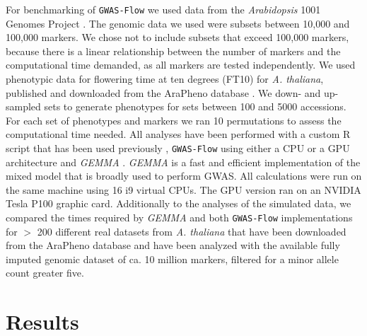 For benchmarking of \texttt{GWAS-Flow} we used data from the \textit{Arabidopsis} 1001 Genomes Project
\cite{1001genome}. The genomic data we used were subsets between 10,000 and 100,000 markers. We chose not to
include subsets that exceed 100,000 markers, because there is a linear relationship between the number of
markers and the computational time demanded, as all markers are tested independently. We used phenotypic data
for flowering time at ten degrees (FT10) for \textit{A. thaliana}, published and downloaded from the AraPheno
database \cite{seren2016arapheno}. We down- and up-sampled sets to generate phenotypes for sets between 100
and 5000 accessions. For each set of phenotypes and markers we ran 10 permutations to assess the
computational time needed. All analyses have been performed with a custom R script that has been used
previously \cite{togninalli2017aragwas}, \texttt{GWAS-Flow} using either a CPU or a GPU architecture and
\textit{GEMMA} \cite{Zhou2012}. \textit{GEMMA} is a fast and efficient implementation of the mixed model that
is broadly used to perform GWAS. All calculations were run on the same machine using 16 i9 virtual CPUs. The
GPU version ran on an NVIDIA Tesla P100 graphic card. Additionally to the analyses of the simulated data, we
compared the times required by \textit{GEMMA} and both \texttt{GWAS-Flow} implementations for $>$ 200
different real datasets from \textit{A. thaliana} that have been downloaded from the AraPheno
\cite{seren2016arapheno} database and have been analyzed with the available fully imputed genomic dataset of
ca. 10 million markers, filtered for a minor allele count greater five.

\section{Results}

